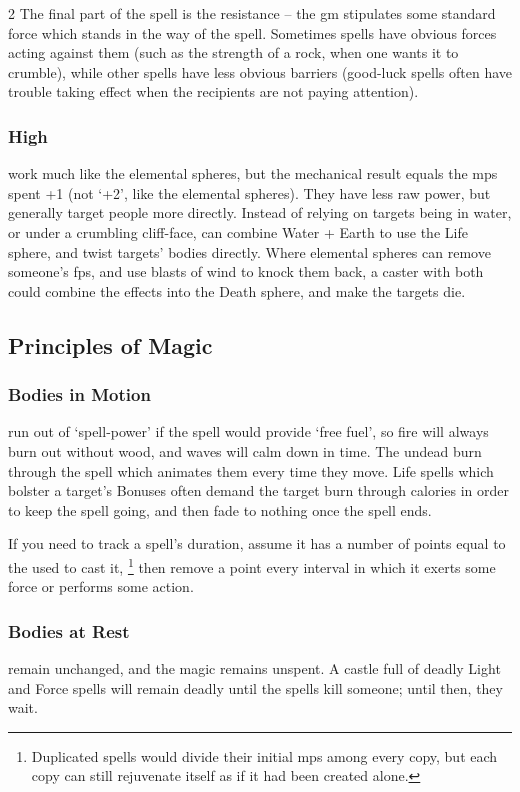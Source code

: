 \begin{multicols}{2}
The final part of the spell is the resistance -- the \gls{gm} stipulates some standard force which stands in the way of the spell.
Sometimes spells have obvious forces acting against them (such as the strength of a rock, when one wants it to crumble), while other spells have less obvious barriers (good-luck spells often have trouble taking effect when the recipients are not paying attention).

\subsubsection{High }
\label{highResolution}
work much like the elemental \glspl{sphere}, but the mechanical result equals the \glspl{mp} spent +1 (not `+2', like the elemental \glspl{sphere}).
They have less raw power, but generally target people more directly.
Instead of relying on targets being in water, or under a crumbling cliff-face,  can combine Water + Earth to use the Life \gls{sphere}, and twist targets' bodies directly.
Where elemental \glspl{sphere} can remove someone's \glspl{fp}, and use blasts of wind to knock them back, a caster with both could combine the effects into the Death \gls{sphere}, and make the targets die.

\subsection{Principles of Magic}

\subsubsection{Bodies in Motion}
run out of `spell-power' if the spell would provide `free fuel', so fire will always burn out without wood, and waves will calm down in time.
The undead burn through the spell which animates them every time they move.
Life spells which bolster a target's Bonuses often demand the target burn through calories in order to keep the spell going, and then fade to nothing once the spell ends.

If you need to track a spell's duration, assume it has a number of points equal to the  used to cast it,%
\footnote{Duplicated spells would divide their initial \glspl{mp} among every copy, but each copy can still rejuvenate itself as if it had been created alone.}
then remove a point every \gls{interval} in which it exerts some force or performs some action.

\subsubsection{Bodies at Rest}
remain unchanged, and the magic remains unspent.
A castle full of deadly Light and Force \glspl{spell} will remain deadly until the \glspl{spell} kill someone; until then, they wait.


\end{multicols}
